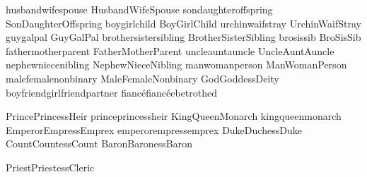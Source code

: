 \mfornb{\spouse}	{husband}{wife}{spouse}
\mfornb{\Spouse}	{Husband}{Wife}{Spouse}
\mfornb{\offspring}	{son}{daughter}{offspring}
\mfornb{\Offspring}	{Son}{Daughter}{Offspring}
\mfornb{\child}		{boy}{girl}{child}
\mfornb{\Child}		{Boy}{Girl}{Child}
\mfornb{\stray}	{urchin}{waif}{stray}
\mfornb{\Stray}	{Urchin}{Waif}{Stray}
\mfornb{\pal}		{guy}{gal}{pal}
\mfornb{\Pal}		{Guy}{Gal}{Pal}
\mfornb{\sibling}	{brother}{sister}{sibling}
\mfornb{\Sibling}	{Brother}{Sister}{Sibling}
\mfornb{\sib} {bro}{sis}{sib}
\mfornb{\Sib} {Bro}{Sis}{Sib}
\mfornb{\parent}	{father}{mother}{parent}
\def\grandparent{grand\parent}
\def\Grandparent{Grand\parent}
\mfornb{\Parent}	{Father}{Mother}{Parent}
\mfornb{\auncle}	{uncle}{aunt}{auncle}
\mfornb{\Auncle}	{Uncle}{Aunt}{Auncle}
\mfornb{\nibling}	{nephew}{niece}{nibling}
\mfornb{\Nibling}	{Nephew}{Niece}{Nibling}
\mfornb{\person}	{man}{woman}{person} %
\mfornb{\Person}	{Man}{Woman}{Person}
\mfornb{\sex}		{male}{female}{nonbinary}
\mfornb{\Sex}		{Male}{Female}{Nonbinary}
\mfornb{\Deity}		{God}{Goddess}{Deity}
\def\God{\Deity}
\mfornb{\partner}	{boyfriend}{girlfriend}{partner}
\mfornb{\betrothed} {fianc\'e}{fianc\'ee}{betrothed}

\mfornb{\Heir}		{Prince}{Princess}{Heir}
\mfornb{\heir}		{prince}{princess}{heir}
\mfornb{\Monarch}		{King}{Queen}{Monarch}
\mfornb{\monarch}		{king}{queen}{monarch}
\mfornb{\Emperor}		{Emperor}{Empress}{Emprex}
\mfornb{\emperor}		{emperor}{empress}{emprex}
\mfornb{\Duke} 		{Duke}{Duchess}{Duke}
\mfornb{\Count}		{Count}{Countess}{Count}
\mfornb{\Baron}		{Baron}{Baroness}{Baron}

\mfornb{\Cleric}		{Priest}{Priestess}{Cleric}


